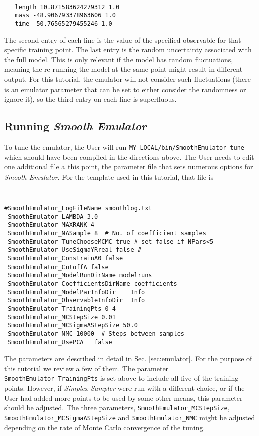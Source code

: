 \documentclass[UserManual.tex]{subfiles}
\begin{document}
{\tt
\begin{verbatim}
   length 10.871583624279312 1.0
   mass -48.906793378963606 1.0
   time -50.76565279455246 1.0
\end{verbatim}
}
The second entry of each line is the value of the specified observable for that specific training point. The last entry is the random uncertainty associated with the full model. This is only relevant if the model has random fluctuations, meaning the re-running the model at the same point might result in different output. For this tutorial, the emulator will not consider such fluctuations (there is an emulator parameter that can be set to either consider the randomness or ignore it), so the third entry on each line is superfluous.

\subsection{Running {\it Smooth Emulator}}
To tune the emulator, the User will run {\tt MY\_LOCAL/bin/SmoothEmulator\_tune} which should have been compiled in the directions above. The User needs to edit one additional file a this point, the parameter file that sets numerous options for {\it Smooth Emulator}. For the template used in this tutorial, that file is

{\tt
\begin{verbatim}
#SmoothEmulator_LogFileName smoothlog.txt
 SmoothEmulator_LAMBDA 3.0
 SmoothEmulator_MAXRANK 4
 SmoothEmulator_NASample 8  # No. of coefficient samples
 SmoothEmulator_TuneChooseMCMC true # set false if NPars<5
 SmoothEmulator_UseSigmaYRreal false # 
 SmoothEmulator_ConstrainA0 false
 SmoothEmulator_CutoffA false
 SmoothEmulator_ModelRunDirName modelruns
 SmoothEmulator_CoefficientsDirName coefficients
 SmoothEmulator_ModelParInfoDir    Info
 SmoothEmulator_ObservableInfoDir  Info
 SmoothEmulator_TrainingPts 0-4
 SmoothEmulator_MCStepSize 0.01
 SmoothEmulator_MCSigmaAStepSize 50.0
 SmoothEmulator_NMC 10000  # Steps between samples 
 SmoothEmulator_UsePCA   false
\end{verbatim}
}
The parameters are described in detail in Sec. \ref{sec:emulator}. For the purpose of this tutorial we review a few of them. The parameter {\tt SmoothEmulator\_TrainingPts} is set above to include all five of the training points. However, if {\it Simplex Sampler} were run with a different choice, or if the User had added more points to be used by some other means, this parameter should be adjusted. The three parameters, {\tt SmoothEmulator\_MCStepSize}, {\tt SmoothEmulator\_MCSigmaAStepSize} and {\tt SmoothEmulator\_NMC} might be adjusted depending on the rate of Monte Carlo convergence of the tuning.
\end{document}
